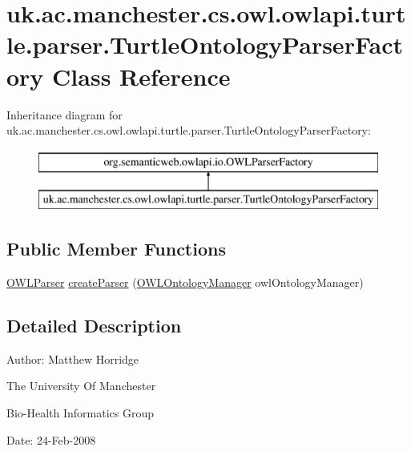 \hypertarget{classuk_1_1ac_1_1manchester_1_1cs_1_1owl_1_1owlapi_1_1turtle_1_1parser_1_1_turtle_ontology_parser_factory}{\section{uk.\-ac.\-manchester.\-cs.\-owl.\-owlapi.\-turtle.\-parser.\-Turtle\-Ontology\-Parser\-Factory Class Reference}
\label{classuk_1_1ac_1_1manchester_1_1cs_1_1owl_1_1owlapi_1_1turtle_1_1parser_1_1_turtle_ontology_parser_factory}
}
Inheritance diagram for uk.\-ac.\-manchester.\-cs.\-owl.\-owlapi.\-turtle.\-parser.\-Turtle\-Ontology\-Parser\-Factory\-:\begin{figure}[H]
\begin{center}
\leavevmode
\includegraphics[height=2.000000cm]{classuk_1_1ac_1_1manchester_1_1cs_1_1owl_1_1owlapi_1_1turtle_1_1parser_1_1_turtle_ontology_parser_factory}
\end{center}
\end{figure}
\subsection*{Public Member Functions}
\begin{DoxyCompactItemize}
\item 
\hyperlink{interfaceorg_1_1semanticweb_1_1owlapi_1_1io_1_1_o_w_l_parser}{O\-W\-L\-Parser} \hyperlink{classuk_1_1ac_1_1manchester_1_1cs_1_1owl_1_1owlapi_1_1turtle_1_1parser_1_1_turtle_ontology_parser_factory_a08bebf5911b8495e55b6c1b4ecedf853}{create\-Parser} (\hyperlink{interfaceorg_1_1semanticweb_1_1owlapi_1_1model_1_1_o_w_l_ontology_manager}{O\-W\-L\-Ontology\-Manager} owl\-Ontology\-Manager)
\end{DoxyCompactItemize}


\subsection{Detailed Description}
Author\-: Matthew Horridge\par
 The University Of Manchester\par
 Bio-\/\-Health Informatics Group\par
 Date\-: 24-\/\-Feb-\/2008\par
\par
 

